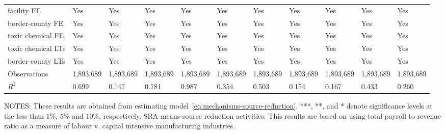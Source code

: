 \begin{table}[H]
{\begin{tabular}{@{}lllllllllll@{}}
            facility FE           & Yes       & Yes             & Yes        & Yes                   & Yes            & Yes       & Yes                   & Yes                 & Yes                 & Yes                   \\
            border-county FE      & Yes       & Yes             & Yes        & Yes                   & Yes            & Yes       & Yes                   & Yes                 & Yes                 & Yes                   \\
            toxic chemical FE     & Yes       & Yes             & Yes        & Yes                   & Yes            & Yes       & Yes                   & Yes                 & Yes                 & Yes                   \\
            toxic chemical LTs    & Yes       & Yes             & Yes        & Yes                   & Yes            & Yes       & Yes                   & Yes                 & Yes                 & Yes                   \\
            border-county LTs     & Yes       & Yes             & Yes        & Yes                   & Yes            & Yes       & Yes                   & Yes                 & Yes                 & Yes                   \\\midrule
            Observations          & 1,893,689 & 1,893,689       & 1,893,689  & 1,893,689             & 1,893,689      & 1,893,689 & 1,893,689             & 1,893,689           & 1,893,689             & 1,893,689           \\
            $R^2$                 & 0.699     & 0.147           & 0.781      & 0.987                 & 0.354          & 0.503     & 0.154                 & 0.167               & 0.433               & 0.260                 \\ \bottomrule\bottomrule
        \end{tabular}%
    }
    \begin{minipage}{\columnwidth}
        \vspace{0.05in}
        \tiny NOTES: These results are obtained from estimating model~\ref{eq:mechanisms-source-reduction}. ***, **, and * denote significance levels at the less than $1\%$, $5\%$ and $10\%$, respectively. SRA means source reduction activities. This results are based on using total payroll to revenue ratio as a measure of labour v. capital intensive manufacturing industries.
    \end{minipage}
\end{table}